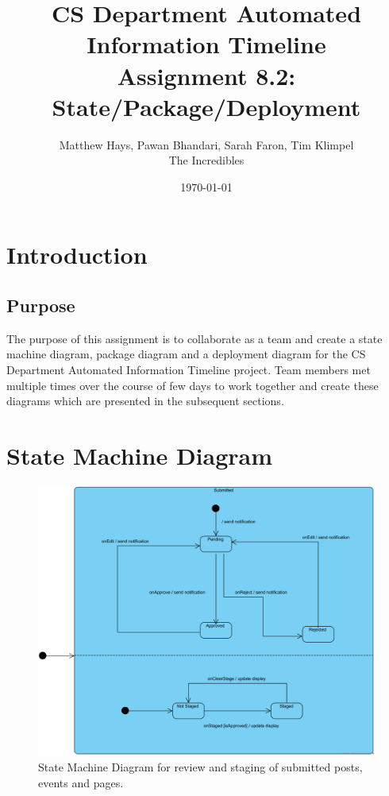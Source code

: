 \documentclass{article}
\title{CS Department Automated Information Timeline \\ Assignment 8.2: State/Package/Deployment}
\date{\today}
\author{Matthew Hays, Pawan Bhandari, Sarah Faron, Tim Klimpel \\ The Incredibles}
\begin{document}
\maketitle
\newpage
\tableofcontents
\listoffigures
\newpage
\section{Introduction}
\subsection{Purpose}
The purpose of this assignment is to collaborate as a team and create a state machine diagram, package diagram and a deployment diagram for the CS Department Automated Information Timeline project. Team members met multiple times over the course of few days to work together and create these diagrams which are presented in the subsequent sections.

\section{State Machine Diagram}

\begin{figure}[H]
    \centering
    \includegraphics[width=.98\textwidth]{images/State_Machine_Diagram.png}
    \centering
    \caption{State Machine Diagram for review and staging of submitted posts, events and pages.}
\end{figure}
\end{document}

